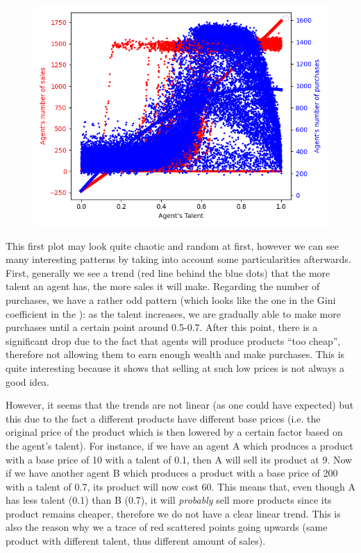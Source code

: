 {{{{{{{{{{{        \begin{figure}
            \includegraphics[width=\linewidth]{img/exp/11.png}
        \end{figure} 
        { This first plot may look quite chaotic and random at first, however we can see many interesting patterns by taking into account some particularities afterwards. First, generally we see a trend (red line behind the blue dots) that the more talent an agent has, the more sales it will make. Regarding the number of purchases, we have a rather odd pattern (which looks like the one in the Gini coefficient in the ): as the talent increases, we are gradually able to make more purchases until a certain point around 0.5-0.7. After this point, there is a significant drop due to the fact that agents will produce products ``too cheap'', therefore not allowing them to earn enough wealth and make purchases. This is quite interesting because it shows that selling at such low prices is not always a good idea.
        
        However, it seems that the trends are not linear (as one could have expected) but this due to the fact a different products have different base prices (i.e. the original price of the product which is then lowered by a certain factor based on the agent's talent). For instance, if we have an agent A which produces a product with a base price of 10 with a talent of 0.1, then A will sell its product at 9. Now if we have another agent B which produces a product with a base price of 200 with a talent of 0.7, its product will now cost 60. This means that, even though A has less talent (0.1) than B (0.7), it will \emph{probably} sell more products since its product remains cheaper, therefore we do not have a clear linear trend.
        This is also the reason why we a trace of red scattered points going upwards (same product with different talent, thus different amount of sales).
        \par


}}}}}}}}}}}}

